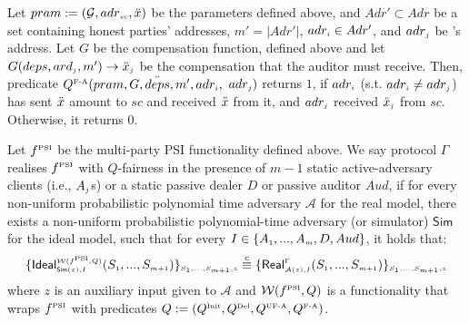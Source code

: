 \begin{definition}  
 Let $pram:=(\mathcal{G}, adr_{\scriptscriptstyle sc}, \ddot{x})$ be the parameters defined above, and $Adr'\subset Adr$ be a set containing honest parties' addresses, $m' = |Adr'|$,     $adr_{\scriptscriptstyle i}\in Adr'$, and  $adr_{\scriptscriptstyle j}$ be \aud's address. Let $G$ be the compensation function, defined above and let $G(deps, ard_{\scriptscriptstyle j}, m')\rightarrow \ddot{x}_{\scriptscriptstyle j}$ be the compensation that the auditor must receive.  Then, predicate $Q^{\scriptscriptstyle \text{F-A}}(pram, G, \ddot{deps}, m', adr_{\scriptscriptstyle i},$ $ adr_{\scriptscriptstyle j})$ returns $1$, if $adr_{\scriptscriptstyle i}$ (s.t. $adr_{\scriptscriptstyle i}\neq adr_{\scriptscriptstyle j}$) has sent $\ddot{x}$ amount to $sc$ and received  $\ddot{x}$  from it, and $adr_{\scriptscriptstyle j}$ received $\ddot{x}_{\scriptscriptstyle j}$  from $sc$. Otherwise, it returns $0$. 
 \end{definition}
  
  
  
 
 
 \vs
 \vs
 
\begin{definition}[\p]\label{def::PSI-Q-fair}
Let $f^{\scriptscriptstyle \text{PSI}}$ be the multi-party PSI functionality defined above. We say  protocol $\Gamma$ realises  $f^{\scriptscriptstyle \text{PSI}}$ with $Q$-fairness in the presence of $m-1$ static active-adversary clients (i.e., $A_{\scriptscriptstyle j}$s) or a static passive dealer $D$ or passive auditor $Aud$, if for every non-uniform probabilistic polynomial time adversary $\mathcal{A}$ for the real model, there exists a non-uniform probabilistic polynomial-time adversary (or simulator) $\mathsf{Sim}$ for the ideal model, such that for every $I\in \{A_{\scriptscriptstyle 1},...,A_{\scriptscriptstyle m}, D, Aud\}$, it holds that: 
%
\begin{equation*}
\{\mathsf {Ideal}^{\scriptscriptstyle \mathcal{W}(f^{\scriptscriptstyle \text{PSI}},Q)}_{\scriptscriptstyle \mathsf{Sim}(z), I}(S_{\scriptscriptstyle 1},..., S_{\scriptscriptstyle m+1})\}_{\scriptscriptstyle S_{\scriptscriptstyle 1},..., S_{\scriptscriptstyle m+1},z}\stackrel{c}{\equiv} \{\mathsf{Real}_{\scriptscriptstyle \mathcal{A}(z), I}^{\scriptscriptstyle \Gamma}(S_{\scriptscriptstyle 1},..., S_{\scriptscriptstyle m+1}) \}_{\scriptscriptstyle S_{\scriptscriptstyle 1},..., S_{\scriptscriptstyle m+1},z}
\end{equation*}
where  $z$ is an auxiliary input given to $\mathcal{A}$ and  $\mathcal{W}(f^{\scriptscriptstyle \text{PSI}},Q)$ is a functionality that wraps $f^{\scriptscriptstyle \text{PSI}}$ with predicates $Q:=(Q^{\scriptscriptstyle \text{Init}}, Q^{\scriptscriptstyle \text{Del}}, Q^{\scriptscriptstyle \text{UF-A}}, Q^{\scriptscriptstyle \text{F-A}})$. 
  \end{definition}
 
